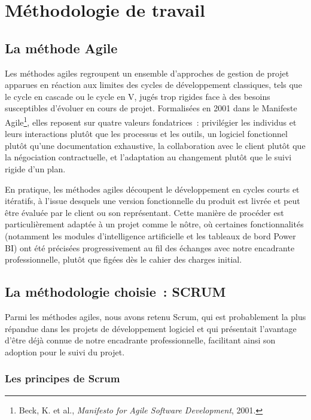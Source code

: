 \section{Méthodologie de travail}
\label{sec:methodologie}

\subsection{La méthode Agile}
\label{subsec:methode-agile}

Les méthodes agiles regroupent un ensemble d'approches de gestion de projet apparues en réaction aux limites des cycles de développement classiques, tels que le cycle en cascade ou le cycle en V, jugés trop rigides face à des besoins susceptibles d'évoluer en cours de projet. Formalisées en 2001 dans le Manifeste Agile\footnote{Beck, K. et al., \emph{Manifesto for Agile Software Development}, 2001.}, elles reposent sur quatre valeurs fondatrices~: privilégier les individus et leurs interactions plutôt que les processus et les outils, un logiciel fonctionnel plutôt qu'une documentation exhaustive, la collaboration avec le client plutôt que la négociation contractuelle, et l'adaptation au changement plutôt que le suivi rigide d'un plan.

En pratique, les méthodes agiles découpent le développement en cycles courts et itératifs, à l'issue desquels une version fonctionnelle du produit est livrée et peut être évaluée par le client ou son représentant. Cette manière de procéder est particulièrement adaptée à un projet comme le nôtre, où certaines fonctionnalités (notamment les modules d'intelligence artificielle et les tableaux de bord Power BI) ont été précisées progressivement au fil des échanges avec notre encadrante professionnelle, plutôt que figées dès le cahier des charges initial.

\subsection{La méthodologie choisie~: SCRUM}
\label{subsec:scrum}

Parmi les méthodes agiles, nous avons retenu Scrum, qui est probablement la plus répandue dans les projets de développement logiciel et qui présentait l'avantage d'être déjà connue de notre encadrante professionnelle, facilitant ainsi son adoption pour le suivi du projet.

\subsubsection{Les principes de Scrum}
\label{subsubsec:principes-scrum}

